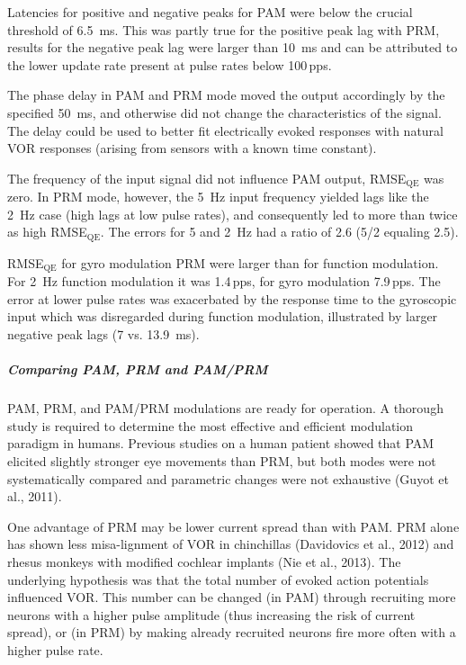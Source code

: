 Latencies for positive and negative peaks for PAM were below the crucial threshold of \SI{6.5}{\milli\second}. This was partly true for the positive peak lag with PRM, results for the negative peak lag were larger than \SI{10}{\milli\second} and can be attributed to the lower update rate present at pulse rates below 100\,pps.

The phase delay in PAM and PRM mode moved the output accordingly by the specified \SI{50}{\milli\second}, and otherwise did not change the characteristics of the signal. The delay could be used to better fit electrically evoked responses with natural VOR responses (arising from sensors with a known time constant).

The frequency of the input signal did not influence PAM output, RMSE$_{\text{QE}}$ was zero. In PRM mode, however, the \SI{5}{\hertz} input frequency yielded lags like the \SI{2}{\hertz} case (high lags at low pulse rates), and consequently led to more than twice as high RMSE$_{\text{QE}}$. The errors for 5 and \SI{2}{\hertz} had a ratio of 2.6 (5/2 equaling 2.5).  

RMSE$_{\text{QE}}$ for gyro modulation PRM were larger than for function modulation. For \SI{2}{\hertz} function modulation it was 1.4\,pps, for gyro modulation 7.9\,pps. The error at lower pulse rates was exacerbated by the response time to the gyroscopic input which was disregarded during function modulation, illustrated by larger negative peak lags (7 vs. \SI{13.9}{\milli\second}).

\subparagraph{Comparing PAM, PRM and PAM/PRM}
PAM, PRM, and PAM/PRM modulations are ready for operation. A thorough study is required to determine the most effective and efficient modulation paradigm in humans. Previous studies on a human patient showed that PAM elicited slightly stronger eye movements than PRM, but both modes were not systematically compared and parametric changes were not exhaustive (Guyot et al., 2011).

One advantage of PRM may be lower current spread than with PAM. PRM alone has shown less misa-lignment of VOR in chinchillas (Davidovics et al., 2012) and rhesus monkeys with modified cochlear implants (Nie et al., 2013). The underlying hypothesis was that the total number of evoked action potentials influenced VOR. This number can be changed (in PAM) through recruiting more neurons with a higher pulse amplitude (thus increasing the risk of current spread), or (in PRM) by making already recruited neurons fire more often with a higher pulse rate. 

